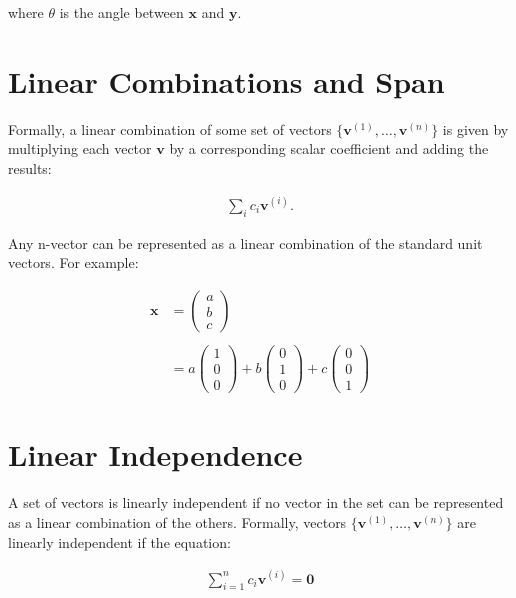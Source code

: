 \documentclass[12pt]{article}
\begin{document}
where $\theta$ is the angle between $\mathbf{x}$ and $\mathbf{y}$.

\section{Linear Combinations and Span}

Formally, a linear combination of some set of vectors $\{\mathbf{v}^{(1)},\ldots, \mathbf{v}^{(n)} \}$ is given by multiplying each vector $\mathbf{v}$ by a corresponding scalar coefficient and adding the results:

\begin{align}
\sum_{i}{c}_{i}\mathbf{v}^{(i)}.
\end{align}

Any n-vector can be represented as a linear combination of the standard unit vectors. For example:

\begin{align}
\mathbf{x} &= \begin{pmatrix}a\\ b\\ c\end{pmatrix} \\ \\
&= a\begin{pmatrix}1\\ 0\\ 0\end{pmatrix}+b\begin{pmatrix}0\\ 1\\ 0\end{pmatrix}+c\begin{pmatrix}0\\ 0\\ 1\end{pmatrix}
\end{align}

\section{Linear Independence}

A set of vectors is linearly independent if no vector in the set can be represented as a linear combination of the others. Formally, vectors $\{\mathbf{v}^{(1)},\ldots, \mathbf{v}^{(n)} \}$ are linearly independent if the equation:

\begin{align}
\sum_{i=1}^n c_i\mathbf{v}^{(i)} = \mathbf{0}
\end{align}
\end{document}
